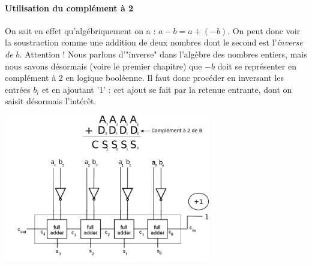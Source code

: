 \paragraph{Utilisation du complément à 2}
On sait en effet qu'algébriquement on a : $a-b=a+(-b)$. On peut donc voir la soustraction comme une addition de deux nombres dont le second est l'{\it inverse de $b$}.
Attention ! Nous parlons d'"inverse" dans l'algèbre des nombres entiers, mais nous savons désormais (voire le premier chapitre) que $-b$ doit se représenter en complément à 2 en logique
booléenne.
Il faut donc procéder en inversant les entrées $b_i$ et en ajoutant '1' : cet ajout se fait par la retenue entrante, dont on saisit désormais l'intérêt.
\begin{center}
  \centering
  \includegraphics[width=9cm]{./figures/soustracteur.png}
\end{center}


